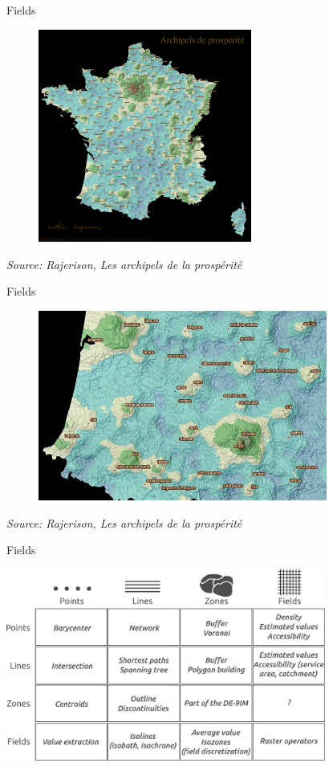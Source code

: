 \begin{frame}{Fields}

\begin{figure}
\includegraphics[width=7cm]{Rajerison_Revenu.jpg}
\end{figure}

\footnotesize
\textit{Source: Rajerison, Les archipels de la prospérité}
\normalsize

\end{frame}



\begin{frame}{Fields}

\begin{figure}
\includegraphics[width=9.5cm]{Rajerison_Zoom.jpg}
\end{figure}

\footnotesize
\textit{Source: Rajerison, Les archipels de la prospérité}
\normalsize
\end{frame}



\begin{frame}{Fields}
\begin{center}
\includegraphics[width=10.5cm]{TypesObjets.pdf}
\end{center}
\end{frame}





